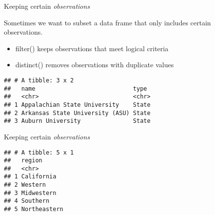 \documentclass[ignorenonframetext,]{beamer}
\newenvironment{Shaded}{\begin{snugshade}}{\end{snugshade}}
\newcommand{\KeywordTok}[1]{\textcolor[rgb]{0.13,0.29,0.53}{\textbf{#1}}}
\newcommand{\DecValTok}[1]{\textcolor[rgb]{0.00,0.00,0.81}{#1}}
\newcommand{\StringTok}[1]{\textcolor[rgb]{0.31,0.60,0.02}{#1}}
\newcommand{\OperatorTok}[1]{\textcolor[rgb]{0.81,0.36,0.00}{\textbf{#1}}}
\newcommand{\NormalTok}[1]{#1}
\providecommand{\tightlist}{%
	\setlength{\itemsep}{0pt}\setlength{\parskip}{0pt}}
\begin{document}
\begin{frame}[fragile]{Keeping certain \textit{observations}}

Sometimes we want to subset a data frame that only includes certain
observations.

\begin{itemize}
\tightlist
\item
  filter() keeps observations that meet logical criteria
\item
  distinct() removes observations with duplicate values
\end{itemize}

\begin{Shaded}
\end{Shaded}

\begin{verbatim}
## # A tibble: 3 x 2
##   name                            type 
##   <chr>                           <chr>
## 1 Appalachian State University    State
## 2 Arkansas State University (ASU) State
## 3 Auburn University               State
\end{verbatim}

\end{frame}

\begin{frame}[fragile]{Keeping certain \textit{observations}}

\begin{Shaded}
\end{Shaded}

\begin{verbatim}
## # A tibble: 5 x 1
##   region      
##   <chr>       
## 1 California  
## 2 Western     
## 3 Midwestern  
## 4 Southern    
## 5 Northeastern
\end{verbatim}

\end{frame}
\end{document}
